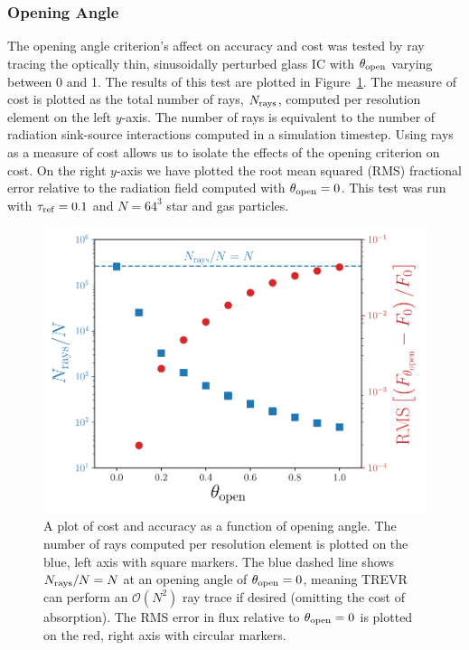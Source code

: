 \documentclass[fleq,usenatbib]{mnras}
\newcommand{\acro}{TREVR}
\newcommand{\bigO}[1]{\mathcal{O}\left(#1\right)}
\newcommand{\tr}{\tau_{\rm ref}}
\newcommand{\tO}{\theta_{\rm open}}
\begin{document}
{\subsubsection{Opening Angle}
The opening angle criterion's affect on accuracy and cost was tested by 
ray tracing the optically thin, sinusoidally perturbed glass IC with $\tO$ 
varying between 0 and 1. The results of this test are plotted in 
Figure~\ref{fig:openangle}. The measure of cost is plotted as the total number 
of rays, $N_{\rm rays}$, computed per resolution element on the left $y$-axis. 
The number of rays is equivalent to the number of radiation sink-source 
interactions computed in a simulation timestep. Using rays as a measure of 
cost allows us to isolate the effects of the opening criterion on cost. On 
the right $y$-axis we have plotted the root mean squared (RMS) fractional 
error relative to the radiation field computed with $\tO=0$. This test was run 
with $\tr = 0.1$ and $N=64^3$ star and gas particles.
\begin{figure}
\includegraphics[width=1\linewidth]{Figures/opening_angle.pdf}
\caption{A plot of cost and accuracy as a function of opening angle. The 
number of rays computed per resolution element is plotted on the blue, 
left axis with square markers. The blue dashed line shows $N_{\rm rays}/N 
= N$ at an opening angle of $\tO=0$, meaning \acro{} can perform an 
$\bigO{N^2}$ ray trace if desired (omitting the cost of absorption). The RMS 
error in flux relative to $\tO=0$ is plotted on the red, right axis with 
circular markers.}
\label{fig:openangle}
\end{figure}

}
\end{document}
